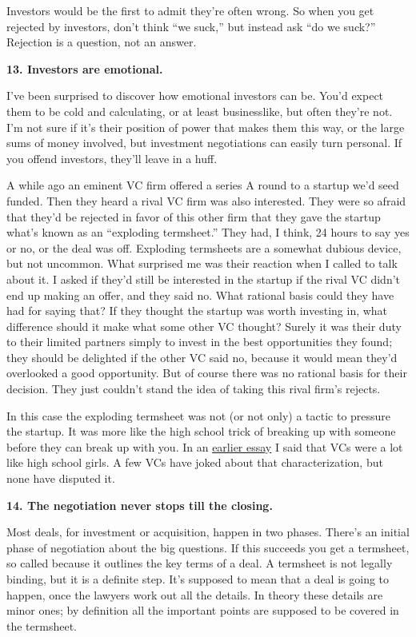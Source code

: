 Investors would be the first to admit they're often wrong. So when you
get rejected by investors, don't think ``we suck,'' but instead ask ``do
we suck?'' Rejection is a question, not an answer.

\textbf{13. Investors are emotional.}

I've been surprised to discover how emotional investors can be. You'd
expect them to be cold and calculating, or at least businesslike, but
often they're not. I'm not sure if it's their position of power that
makes them this way, or the large sums of money involved, but investment
negotiations can easily turn personal. If you offend investors, they'll
leave in a huff.

A while ago an eminent VC firm offered a series A round to a startup
we'd seed funded. Then they heard a rival VC firm was also interested.
They were so afraid that they'd be rejected in favor of this other firm
that they gave the startup what's known as an ``exploding termsheet.''
They had, I think, 24 hours to say yes or no, or the deal was off.
Exploding termsheets are a somewhat dubious device, but not uncommon.
What surprised me was their reaction when I called to talk about it. I
asked if they'd still be interested in the startup if the rival VC
didn't end up making an offer, and they said no. What rational basis
could they have had for saying that? If they thought the startup was
worth investing in, what difference should it make what some other VC
thought? Surely it was their duty to their limited partners simply to
invest in the best opportunities they found; they should be delighted if
the other VC said no, because it would mean they'd overlooked a good
opportunity. But of course there was no rational basis for their
decision. They just couldn't stand the idea of taking this rival firm's
rejects.

In this case the exploding termsheet was not (or not only) a tactic to
pressure the startup. It was more like the high school trick of breaking
up with someone before they can break up with you. In an
\href{startupfunding.html}{earlier essay} I said that VCs were a lot
like high school girls. A few VCs have joked about that
characterization, but none have disputed it.

\textbf{14. The negotiation never stops till the closing.}

Most deals, for investment or acquisition, happen in two phases. There's
an initial phase of negotiation about the big questions. If this
succeeds you get a termsheet, so called because it outlines the key
terms of a deal. A termsheet is not legally binding, but it is a
definite step. It's supposed to mean that a deal is going to happen,
once the lawyers work out all the details. In theory these details are
minor ones; by definition all the important points are supposed to be
covered in the termsheet.

